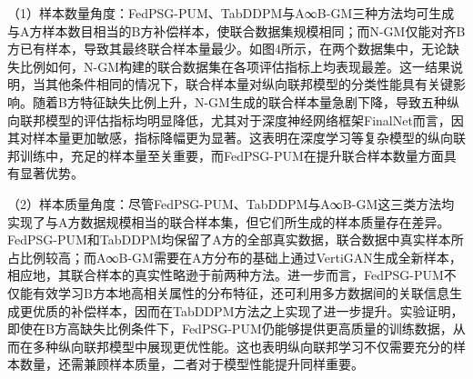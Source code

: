 （1）样本数量角度：FedPSG-PUM、TabDDPM与A∞B-GM三种方法均可生成与A方样本数目相当的B方补偿样本，使联合数据集规模相同；而N-GM仅能对齐B方已有样本，导致其最终联合样本量最少。如图4所示，在两个数据集中，无论缺失比例如何，N-GM构建的联合数据集在各项评估指标上均表现最差。这一结果说明，当其他条件相同的情况下，联合样本量对纵向联邦模型的分类性能具有关键影响。随着B方特征缺失比例上升，N-GM生成的联合样本量急剧下降，导致五种纵向联邦模型的评估指标均明显降低，尤其对于深度神经网络框架FinalNet而言，因其对样本量更加敏感，指标降幅更为显著。这表明在深度学习等复杂模型的纵向联邦训练中，充足的样本量至关重要，而FedPSG-PUM在提升联合样本数量方面具有显著优势。

（2）样本质量角度：尽管FedPSG-PUM、TabDDPM与A∞B-GM这三类方法均实现了与A方数据规模相当的联合样本集，但它们所生成的样本质量存在差异。FedPSG-PUM和TabDDPM均保留了A方的全部真实数据，联合数据中真实样本所占比例较高；而A∞B-GM需要在A方分布的基础上通过VertiGAN生成全新样本，相应地，其联合样本的真实性略逊于前两种方法。进一步而言，FedPSG-PUM不仅能有效学习B方本地高相关属性的分布特征，还可利用多方数据间的关联信息生成更优质的补偿样本，因而在TabDDPM方法之上实现了进一步提升。实验证明，即使在B方高缺失比例条件下，FedPSG-PUM仍能够提供更高质量的训练数据，从而在多种纵向联邦模型中展现更优性能。这也表明纵向联邦学习不仅需要充分的样本数量，还需兼顾样本质量，二者对于模型性能提升同样重要。